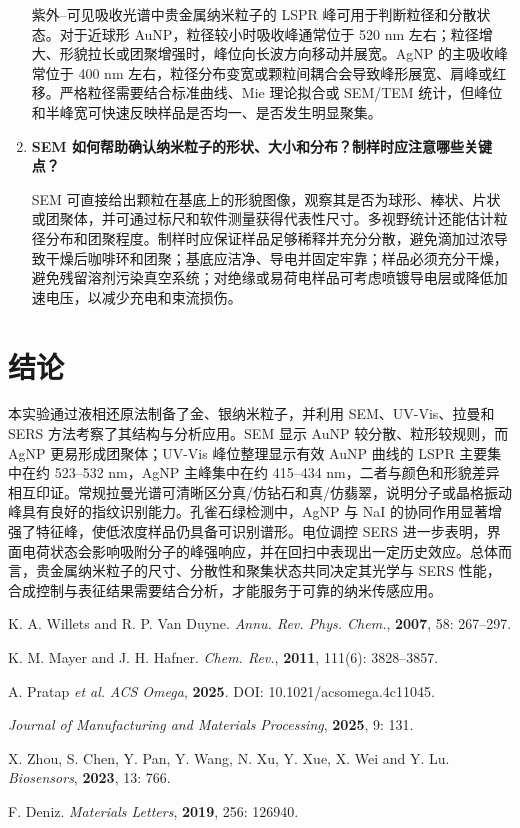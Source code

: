 \documentclass[a4paper]{article}
\begin{document}
\begin{enumerate}[label=\textbf{\arabic*.},leftmargin=2.5em]
        紫外--可见吸收光谱中贵金属纳米粒子的 LSPR 峰可用于判断粒径和分散状态。对于近球形 AuNP，粒径较小时吸收峰通常位于 520 nm 左右；粒径增大、形貌拉长或团聚增强时，峰位向长波方向移动并展宽。AgNP 的主吸收峰常位于 400 nm 左右，粒径分布变宽或颗粒间耦合会导致峰形展宽、肩峰或红移。严格粒径需要结合标准曲线、Mie 理论拟合或 SEM/TEM 统计，但峰位和半峰宽可快速反映样品是否均一、是否发生明显聚集。

  \item \textbf{SEM 如何帮助确认纳米粒子的形状、大小和分布？制样时应注意哪些关键点？}

        SEM 可直接给出颗粒在基底上的形貌图像，观察其是否为球形、棒状、片状或团聚体，并可通过标尺和软件测量获得代表性尺寸。多视野统计还能估计粒径分布和团聚程度。制样时应保证样品足够稀释并充分分散，避免滴加过浓导致干燥后咖啡环和团聚；基底应洁净、导电并固定牢靠；样品必须充分干燥，避免残留溶剂污染真空系统；对绝缘或易荷电样品可考虑喷镀导电层或降低加速电压，以减少充电和束流损伤。
\end{enumerate}

\section{结论}
\vspace{-0.5em}

本实验通过液相还原法制备了金、银纳米粒子，并利用 SEM、UV-Vis、拉曼和 SERS 方法考察了其结构与分析应用。SEM 显示 AuNP 较分散、粒形较规则，而 AgNP 更易形成团聚体；UV-Vis 峰位整理显示有效 AuNP 曲线的 LSPR 主要集中在约 523--532 nm，AgNP 主峰集中在约 415--434 nm，二者与颜色和形貌差异相互印证。常规拉曼光谱可清晰区分真/仿钻石和真/仿翡翠，说明分子或晶格振动峰具有良好的指纹识别能力。孔雀石绿检测中，AgNP 与 NaI 的协同作用显著增强了特征峰，使低浓度样品仍具备可识别谱形。电位调控 SERS 进一步表明，界面电荷状态会影响吸附分子的峰强响应，并在回扫中表现出一定历史效应。总体而言，贵金属纳米粒子的尺寸、分散性和聚集状态共同决定其光学与 SERS 性能，合成控制与表征结果需要结合分析，才能服务于可靠的纳米传感应用。

\vspace{2em}
{\footnotesize
  \begin{thebibliography}{9}
    K. A. Willets and R. P. Van Duyne.
    \textit{Annu. Rev. Phys. Chem.}, \textbf{2007}, 58: 267--297.

    K. M. Mayer and J. H. Hafner.
    \textit{Chem. Rev.}, \textbf{2011}, 111(6): 3828--3857.

    A. Pratap \textit{et al.}
    \textit{ACS Omega}, \textbf{2025}. DOI: 10.1021/acsomega.4c11045.

    \textit{Journal of Manufacturing and Materials Processing}, \textbf{2025}, 9: 131.

    X. Zhou, S. Chen, Y. Pan, Y. Wang, N. Xu, Y. Xue, X. Wei and Y. Lu.
    \textit{Biosensors}, \textbf{2023}, 13: 766.

    F. Deniz.
    \textit{Materials Letters}, \textbf{2019}, 256: 126940.
  \end{thebibliography}
}
\end{document}
